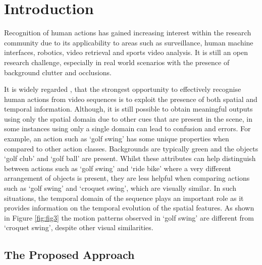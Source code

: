 \documentclass[10pt,twocolumn,letterpaper]{article}
\begin{document}

\section{Introduction}

	Recognition of human actions has gained increasing interest within the research community due to its applicability to areas such as surveillance, human machine interfaces, robotics, video retrieval and sports video analysis. It is still an open research challenge, especially in real world scenarios with the presence of background clutter and occlusions.
	
	
	It is widely regarded \cite{Simonyan2014, Jeff2015}, that the strongest opportunity to effectively recognise human actions from video sequences is to exploit the presence of both spatial and temporal information. Although, it is still possible to obtain meaningful outputs using only the spatial domain  due to other cues that are present in the scene, in some instances using only a single domain can lead to confusion and errors. For example, an action such as `golf swing' has some unique properties when compared to other action classes. Backgrounds are typically green and the objects `golf club' and `golf ball' are present. Whilst these attributes can help distinguish between actions such as `golf swing' and `ride bike' where a very different arrangement of objects is present, they are less helpful when comparing actions such as `golf swing' and `croquet swing', which are visually similar. In such situations, the temporal domain of the sequence plays an important role as it provides information on the temporal evolution of the spatial features. As shown in Figure \ref{fig:fig3} the motion patterns observed in `golf swing' are different from `croquet swing', despite other visual similarities. 	
	

\subsection{The Proposed Approach}
	
\end{document}
